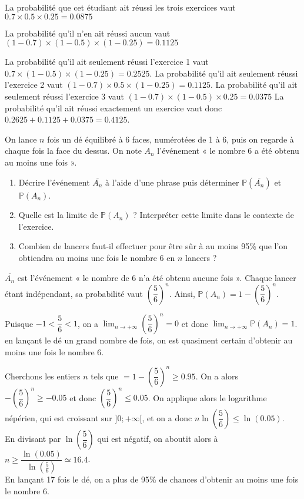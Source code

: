 \documentclass[11pt,fleqn, openany]{book} %
\begin{document}
\begin{solution}La probabilité que cet étudiant ait réussi les trois exercices vaut $0.7  \times 0.5 \times 0.25 = 0.0875$

La probabilité qu'il n'en ait réussi aucun vaut $(1-0.7)\times(1-0.5) \times (1-0.25)=0.1125$

La probabilité qu'il ait seulement réussi l'exercice 1 vaut $0.7 \times (1-0.5) \times (1-0.25)=0.2525$. La probabilité qu'il ait seulement réussi l'exercice 2 vaut $(1-0.7) \times 0.5 \times (1-0.25)=0.1125$.  La probabilité qu'il ait seulement réussi l'exercice 3 vaut $(1-0.7) \times (1-0.5) \times 0.25=0.0375$ La probabilité qu'il ait réussi exactement un exercice vaut donc $0.2625+0.1125+0.0375=0.4125$. \end{solution}




\begin{exercise}On lance $n$ fois un dé équilibré à 6 faces, numérotées de 1 à 6, puis on regarde à chaque fois la face du dessus. On note $A_n$ l'événement « le nombre 6 a été obtenu au moins une fois ».
\begin{enumerate}
\item Décrire l'événement $\overline{A_n}$ à l'aide d'une phrase puis déterminer $\mathbb{P}(\overline{A_n})$ et $\mathbb{P}(A_n)$. 
\item Quelle est la limite de $\mathbb{P}(A_n)$ ? Interpréter cette limite dans le contexte de l'exercice.
\item Combien de lancers faut-il effectuer pour être sûr à au moins 95\% que l'on obtiendra au moins une fois le nombre 6 en $n$ lancers ?
\end{enumerate}\end{exercise}


\begin{solution}$\overline{A_n}$ est l'événement « le nombre de 6 n'a été obtenu aucune fois ». Chaque lancer étant indépendant, sa probabilité vaut $\left(\dfrac{5}{6}\right)^n$. Ainsi, 
$\mathbb{P}(A_n)=1-\left(\dfrac{5}{6}\right)^n$.

Puisque $-1< \dfrac{5}{6} < 1$, on a $\displaystyle\lim_{n \to +\infty} \left(\dfrac{5}{6}\right)^n=0$ et donc $\displaystyle\lim_{n \to +\infty}\mathbb{P}(A_n)=1$. en lançant le dé un grand nombre de fois, on est quasiment certain d'obtenir au moins une fois le nombre 6.

Cherchons les entiers $n$ tels que $=1-\left(\dfrac{5}{6}\right)^n \geqslant 0.95$. On a alors $-\left(\dfrac{5}{6}\right)^n \geqslant -0.05$ et donc $\left(\dfrac{5}{6}\right)^n \leqslant 0.05$. On applique alors le logarithme népérien, qui est croissant sur $]0;+\infty[$, et on a donc $n \ln \left(\dfrac{5}{6}\right) \leqslant \ln(0.05)$. \\En divisant par $\ln\left(\dfrac{5}{6}\right)$ qui est négatif, on aboutit alors à $n \geqslant \dfrac{\ln(0.05)}{\ln\left(\frac{5}{6}\right)}\simeq 16.4$. \\En lançant 17 fois le dé, on a plus de 95\% de chances d'obtenir au moins une fois le nombre 6.\end{solution}
\end{document}
